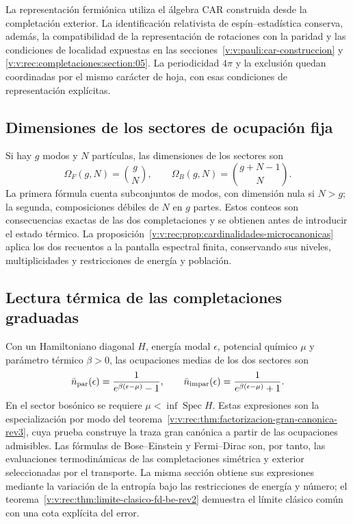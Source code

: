La representación fermiónica utiliza el álgebra CAR construida desde la
completación exterior. La identificación relativista de
espín--estadística conserva, además, la compatibilidad de la representación
de rotaciones con la paridad y las condiciones de localidad expuestas en
las secciones~\ref{v:v:pauli:car-construccion} y
\ref{v:v:rec:completaciones:section:05}. La periodicidad \(4\pi\) y la
exclusión quedan coordinadas por el mismo carácter de hoja, con esas
condiciones de representación explícitas.

\subsection{Dimensiones de los sectores de ocupación fija}
\label{v:v:rec:completaciones:section:07}

Si hay \(g\) modos y \(N\) partículas, las dimensiones de los sectores son
\begin{equation}
 \Omega_F(g,N)=\binom gN,
 \qquad
 \Omega_B(g,N)=\binom{g+N-1}{N}.
 \label{v:v:ocupacion:eq:dimensiones-sectores}
\end{equation}
La primera fórmula cuenta subconjuntos de modos, con dimensión nula si
\(N>g\); la segunda, composiciones débiles de \(N\) en \(g\) partes.
Estos conteos son consecuencias exactas de las dos completaciones y se
obtienen antes de introducir el estado térmico. La
proposición~\ref{v:v:rec:prop:cardinalidades-microcanonicas} aplica los dos
recuentos a la pantalla espectral finita, conservando sus niveles,
multiplicidades y restricciones de energía y población.

\subsection{Lectura térmica de las completaciones graduadas}
\label{v:v:ocupacion:lectura-termica}

Con un Hamiltoniano diagonal \(H\), energía modal \(\epsilon\), potencial
químico \(\mu\) y parámetro térmico \(\beta>0\), las ocupaciones medias
de los dos sectores son
\begin{equation}
 \bar n_{\rm par}(\epsilon)
 =\frac{1}{e^{\beta(\epsilon-\mu)}-1},
 \qquad
 \bar n_{\rm impar}(\epsilon)
 =\frac{1}{e^{\beta(\epsilon-\mu)}+1}.
 \label{v:v:ocupacion:eq:leyes-por-modo}
\end{equation}
En el sector bosónico se requiere \(\mu<\inf\operatorname{Spec}H\).
Estas expresiones son la especialización por modo del
teorema~\ref{v:v:rec:thm:factorizacion-gran-canonica-rev3}, cuya prueba
construye la traza gran canónica a partir de las ocupaciones admisibles.
Las fórmulas de Bose--Einstein y Fermi--Dirac son, por tanto, las
evaluaciones termodinámicas de las completaciones simétrica y exterior
seleccionadas por el transporte. La misma sección obtiene sus expresiones
mediante la variación de la entropía bajo las restricciones de energía y
número; el teorema~\ref{v:v:rec:thm:limite-clasico-fd-be-rev2} demuestra el
límite clásico común con una cota explícita del error.
